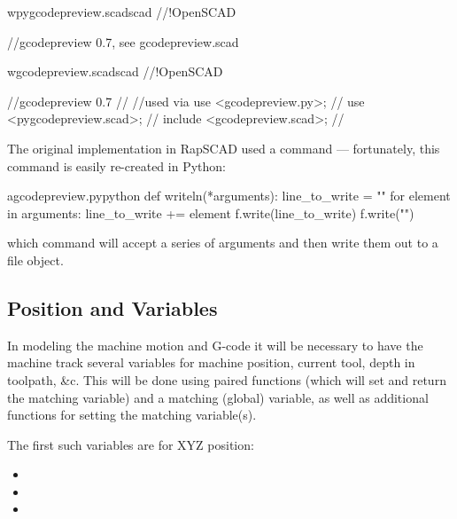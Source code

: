 \documentclass{ltxdoc}
\begin{document}
\begin{writecode}{w}{pygcodepreview.scad}{scad}
//!OpenSCAD
 
//gcodepreview 0.7, see gcodepreview.scad

\end{writecode}
\addtocounter{pyscad}{5}

\begin{writecode}{w}{gcodepreview.scad}{scad}
//!OpenSCAD
 
//gcodepreview 0.7
//
//used via use <gcodepreview.py>;
//         use <pygcodepreview.scad>;
//         include <gcodepreview.scad>;
//

\end{writecode}
\addtocounter{gcpscad}{10}

The original implementation in RapSCAD used a command  --- fortunately, 
this command is easily re-created in Python:

\lstset{firstnumber=\thegcpy}
\begin{writecode}{a}{gcodepreview.py}{python}
def writeln(*arguments):
    line_to_write = ""
    for element in arguments:
        line_to_write += element
    f.write(line_to_write)
    f.write("\n")
    
\end{writecode}
\addtocounter{gcpy}{7}

\noindent which command will accept a series of arguments and then write them out to a file 
object.

\subsection{Position and Variables}
 
In modeling the machine motion and G-code it will be necessary to have the machine track 
several variables for machine position, current tool, depth in toolpath, \&c. 
This will be done using paired functions (which will set and return the  
matching variable) and a matching (global) variable, as well as additional functions for 
setting the matching variable(s).

\begin{samepage}
The first such variables are for XYZ position:

\begin{itemize}
 \item {}
 \item {}
 \item {}
\end{itemize}
\end{samepage}
\end{document}
